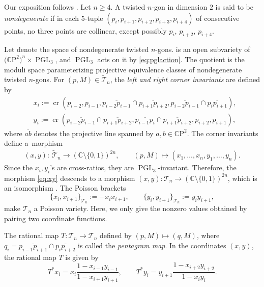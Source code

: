 \documentclass[pdftex]{sigma}
\numberwithin{equation}{section}
\newcommand{\C}{{\mathbb C}}
\newcommand{\CP}{{\mathbb C\mathrm P}}
\newcommand{\PGL}{\operatorname{PGL}}
\newcommand{\ra}{\rightarrow}
\newcommand{\be}{\begin{equation}}
\newcommand{\ee}{\end{equation}}
\newcommand{\la}{\label}
\def\cro{\operatorname{cr}}
\begin{document}
	Our exposition follows \cite{OST1,Weinreich}.
	Let $n \geq 4$. A twisted $n$-gon in dimension $2$ is said to be \emph{nondegenerate} if in each $5$-tuple $(p_i,p_{i+1},p_{i+2},p_{i+3},p_{i+4})$ of consecutive points, no three points are collinear, except possibly $p_i$, $p_{i+2}$, $p_{i+4}$.
	
	Let  denote the space of nondegenerate twisted $n$-gons.  is an open subvariety of $\big(\CP^2\big)^n \times \PGL_3$, and $\PGL_3$ acts on it by \eqref{eq:pglaction}. The quotient \smash{$\mathcal T_n:=\widetilde{\mathcal T}_n / \PGL_3$} is the moduli space parameterizing projective equivalence classes of nondegenerate twisted $n$-gons. For $(p,M) \in \widetilde{\mathcal T}_n$, the \textit{left and right corner invariants} are defined by
	\begin{align*}
		&x_i:= \cro(p_{i-2},p_{i-1},\overline{p_{i-2} p_{i-1}} \cap \overline{p_{i+1} p_{i+2}} ,\overline{p_{i-2} p_{i-1}}\cap \overline{p_i p_{i+1}} ),\\
		&y_i:= \cro( \overline{p_{i-2} p_{i-1}} \cap \overline{p_{i+1} p_{i+2}},\overline{p_{i-1} p_{i}}\cap \overline{p_{i+1} p_{i+2}},p_{i+2},p_{i+1}),
	\end{align*}
	where $\overline{ab}$ denotes the projective line spanned by $a,b \in \CP^2$. The corner invariants define a~morphism
	\begin{align}
		(x,y)\colon \ \widetilde{\mathcal T}_n \ra (\C \setminus\{0,1\})^{2n} , \qquad
		(p,M) \mapsto (x_1,\dots,x_n,y_1,\dots,y_n).\la{eq:xy}
	\end{align}
	Since the $x_i,y_i$'s are cross-ratios, they are $\PGL_3$-invariant. Therefore, the morphism \eqref{eq:xy} descends to a morphism $(x,y)\colon \mathcal T_n \ra (\C \setminus\{0,1\})^{2n}$, which is an isomorphism \cite{Schwartz}. The Poisson brackets
	\be \la{pent:pb}
	\{x_i,x_{i + 1}\}_{\mathcal T_n}:= - x_i x_{i+1}, \qquad \{y_i,y_{i + 1}\}_{\mathcal T_n} := y_i y_{i+1},
	\ee
	make $\mathcal T_n$ a Poisson variety. Here, we only give the nonzero values obtained by pairing two coordinate functions.

	The rational map $T\colon \mathcal T_n \ra \mathcal T_n$ defined by $(p,M) \mapsto (q,M)$, where $q_i=\overline{p_{i-1}p_{i+1}}\cap \overline{p_{i}p_{i+2}}$ is called the \textit{pentagram map}. In the coordinates $(x,y)$, the rational map $T$ is given by {\cite[Lemma~2.4]{OST1}}
	\[
	T^* x_i = x_i \frac{1-x_{i-1}y_{i-1}}{1-x_{i+1}y_{i+1}}, \qquad T^* y_i = y_{i+1} \frac{1-x_{i+2}y_{i+2}}{1-x_{i}y_{i}}.
	\]
	
\end{document}
